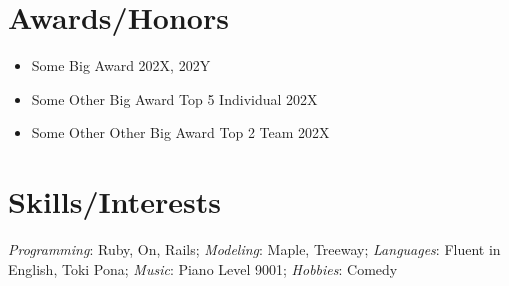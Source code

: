 \documentclass[10pt]{article}
\begin{document}
\section{Awards/Honors}
\begin{itemize}
    \item Some Big Award 202X, 202Y
    \item Some Other Big Award Top 5 Individual 202X
    \item Some Other Other Big Award Top 2 Team 202X
\end{itemize}

\section{Skills/Interests}
\emph{Programming}: Ruby, On, Rails; \emph{Modeling}: Maple, Treeway; \emph{Languages}: Fluent in English, Toki Pona; \emph{Music}: Piano Level 9001; \emph{Hobbies}: Comedy
\end{document}
